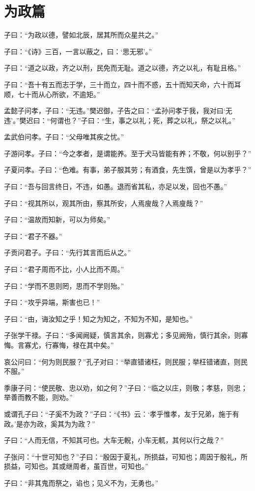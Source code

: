 \documentclass[12pt,a4paper]{ctexbook}
\begin{document}
\section{为政篇}
子曰：“为政以德，譬如北辰，居其所而众星共之。”\par
子曰：“《诗》三百，一言以蔽之，曰：‘思无邪’。”\par
子曰：“道之以政，齐之以刑，民免而无耻。道之以德，齐之以礼，有耻且格。”\par
子曰：“吾十有五而志于学，三十而立，四十而不惑，五十而知天命，六十而耳顺，七十而从心所欲，不逾矩。”\par
孟懿子问孝，子曰：“无违。”樊迟御，子告之曰：“孟孙问孝于我，我对曰‘无违’。”樊迟曰：“何谓也？”子曰：“生，事之以礼；死，葬之以礼，祭之以礼。”\par
孟武伯问孝。子曰：“父母唯其疾之忧。”\par
子游问孝。子曰：“今之孝者，是谓能养。至于犬马皆能有养；不敬，何以别乎？”\par
子夏问孝。子曰：“色难。有事，弟子服其劳；有酒食，先生馔，曾是以为孝乎？”\par
子曰：“吾与回言终日，不违，如愚。退而省其私，亦足以发，回也不愚。”\par
子曰：“视其所以，观其所由，察其所安，人焉廋哉？人焉廋哉？”\par
子曰：“温故而知新，可以为师矣。”\par
子曰：“君子不器。”\par
子贡问君子。子曰：“先行其言而后从之。”\par
子曰：“君子周而不比，小人比而不周。”\par
子曰：“学而不思则罔，思而不学则殆。”\par
子曰：“攻乎异端，斯害也已！”\par
子曰：“由，诲汝知之乎！知之为知之，不知为不知，是知也。”\par
子张学干禄。子曰：“多闻阙疑，慎言其余，则寡尤；多见阙殆，慎行其余，则寡悔。言寡尤，行寡悔，禄在其中矣。”\par
哀公问曰：“何为则民服？”孔子对曰：“举直错诸枉，则民服；举枉错诸直，则民不服。”\par
季康子问：“使民敬、忠以劝，如之何？”子曰：“临之以庄，则敬；孝慈，则忠；举善而教不能，则劝。”\par
或谓孔子曰：“子奚不为政？”子曰：“《书》云：‘孝乎惟孝，友于兄弟，施于有政。’是亦为政，奚其为为政？”\par
子曰：“人而无信，不知其可也。大车无輗，小车无軏，其何以行之哉？”\par
子张问：“十世可知也？”子曰：“殷因于夏礼，所损益，可知也；周因于殷礼，所损益，可知也。其或继周者，虽百世，可知也。”\par
子曰：“非其鬼而祭之，谄也；见义不为，无勇也。”\par
\end{document}

